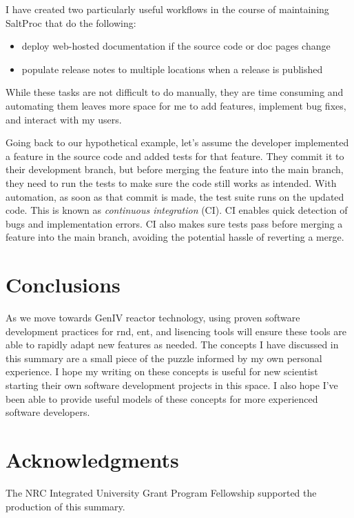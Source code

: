 \documentclass{anstrans}
\begin{document}
     I have created two particularly useful workflows in the course of maintaining SaltProc that do the following:
     \begin{itemize}
         \item deploy web-hosted documentation if the source code or doc pages change
         \item populate release notes to multiple locations when a release is published
     \end{itemize}
     While these tasks are not difficult to do manually, they are time consuming and automating them leaves more space for me to add features, implement bug fixes, and interact with my users.
    
    Going back to our hypothetical example, let's assume the developer implemented a feature in the source code and added tests for that feature. They commit it to their development branch, but before merging the feature into the main branch, they need to run the tests to make sure the code still works as intended. With automation, as soon as that commit is made, the test suite runs on the updated code. This is known as {\it continuous integration} (CI). CI enables quick detection of bugs
    and implementation errors. CI also makes sure tests pass before merging a feature into the main branch, avoiding the potential hassle of reverting a merge.
    

\section{Conclusions}

    As we move towards GenIV reactor technology, using proven software development practices for \Gls{rnd}, \Gls{ent}, and lisencing tools will ensure these tools are able to rapidly adapt new features as needed. The concepts I have discussed in this summary are a small piece of the puzzle informed by my own personal experience. I hope my writing on these concepts is useful for new scientist starting their own software development projects in this
    space. I also hope I've been able to provide useful models of these concepts for more experienced software developers. 

\section{Acknowledgments}
The NRC Integrated University Grant Program Fellowship supported the production of this summary.



\end{document}
